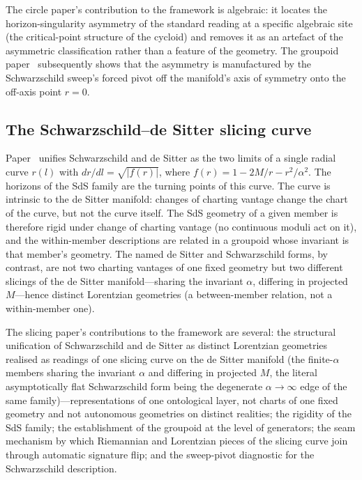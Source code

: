 \documentclass[11pt,a4paper]{article}
\theoremstyle{definition}
\begin{document}
The circle paper's contribution to the framework is algebraic: it locates the horizon-singularity asymmetry of the standard reading at a specific algebraic site (the critical-point structure of the cycloid) and removes it as an artefact of the asymmetric classification rather than a feature of the geometry. The groupoid paper~\cite{JanzenGroupoid} subsequently shows that the asymmetry is manufactured by the Schwarzschild sweep's forced pivot off the manifold's axis of symmetry onto the off-axis point $r=0$.

\subsection{The Schwarzschild--de Sitter slicing curve}\label{sec:slicing}

Paper~\cite{JanzenSlicing} unifies Schwarzschild and de Sitter as the two limits of a single radial curve $r(l)$ with $dr/dl=\sqrt{|f(r)|}$, where $f(r)=1-2M/r-r^{2}/\alpha^{2}$. The horizons of the SdS family are the turning points of this curve. The curve is intrinsic to the de Sitter manifold: changes of charting vantage change the chart of the curve, but not the curve itself. The SdS geometry of a given member is therefore rigid under change of charting vantage (no continuous moduli act on it), and the within-member descriptions are related in a groupoid whose invariant is that member's geometry. The named de Sitter and Schwarzschild forms, by contrast, are not two charting vantages of one fixed geometry but two different slicings of the de Sitter manifold---sharing the invariant $\alpha$, differing in projected $M$---hence distinct Lorentzian geometries (a between-member relation, not a within-member one).

The slicing paper's contributions to the framework are several: the structural unification of Schwarzschild and de Sitter as distinct Lorentzian geometries realised as readings of one slicing curve on the de Sitter manifold (the finite-$\alpha$ members sharing the invariant $\alpha$ and differing in projected $M$, the literal asymptotically flat Schwarzschild form being the degenerate $\alpha\to\infty$ edge of the same family)---representations of one ontological layer, not charts of one fixed geometry and not autonomous geometries on distinct realities; the rigidity of the SdS family; the establishment of the groupoid at the level of generators; the seam mechanism by which Riemannian and Lorentzian pieces of the slicing curve join through automatic signature flip; and the sweep-pivot diagnostic for the Schwarzschild description.
\end{document}
